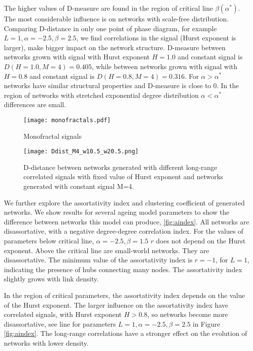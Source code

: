 The higher values of D-measure are found in the region of critical line $\beta(\alpha^{*})$. The most considerable influence is on networks with scale-free distribution. Comparing D-distance in only one point of  phase diagram, for example $L=1, \alpha = -2.5, \beta = 2.5$, we find correlations in the signal (Hurst exponent is larger), make bigger impact on the network structure. D-measure between networks grown with signal with Hurst exponent $H=1.0$ and constant signal is $D(H=1.0, M=4) = 0.405$, while between networks grown with signal with $H=0.8$ and constant signal is $D(H=0.8, M=4) = 0.316$. For $\alpha>\alpha^{*}$ networks have similar structural properties and D-measure is close to 0. In the region of networks with stretched exponential degree distribution $\alpha<\alpha^{*}$  differences are small. 

\begin{figure}[H]
	\centering
	\texttt{[image: monofractals.pdf]}
	\caption{Monofractal signals}\label{fig:monofractals}
\end{figure}

\begin{figure}[H]
	\centering
	\texttt{[image: Ddist\_M4\_w10.5\_w20.5.png]}
	\caption{D-distance between networks generated with different long-range correlated signals with fixed value of Hurst exponent and networks generated with constant signal M=4.}
	\label{fig:Ddist_m}
\end{figure}


We further explore the assortativity index and clustering coefficient of generated networks. We show results for several ageing model parameters to show the difference between networks this model can produce, \ref{fig:aindex}. All networks are disassortative, with a negative degree-degree correlation index. For the values of parameters below critical line, $\alpha=-2.5, \beta=1.5$ $r$ does not depend on the Hurst exponent. Above the critical line are small-world networks. They are disassortative. The minimum value of the assortativity index is $r =-1$, for $L=1$, indicating the presence of hubs connecting many nodes. The assortativity index slightly grows with link density. 

In the region of critical parameters, the assortativity index depends on the value of the Hurst exponent. The larger influence on the assortativity index have correlated signals, with Hurst exponent $H>0.8$, so networks become more disassortative, see line for parameters $L=1, \alpha=-2.5, \beta=2.5$ in Figure \ref{fig:aindex}. The long-range correlations have a stronger effect on the evolution of networks with lower density. 

